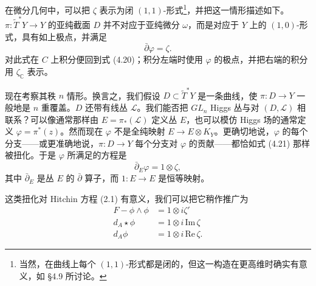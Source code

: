 \documentclass[11pt,a4paper]{article}
\begin{document}
在微分几何中，可以把 $\zeta$ 表示为闭 $(1,1)$-形式\footnote{当然，在曲线上每个 $(1,1)$-形式都是闭的，但这一构造在更高维时确实有意义，如 §4.9 所讨论。}，并把这一情形描述如下。$\pi:\widetilde{T}^*Y\to Y$ 的亚纯截面 $D$ 并不对应于亚纯微分 $\omega$，而是对应于 $Y$ 上的 $(1,0)$-形式，具有如上极点，并满足
\begin{equation}\tag{4.21}
\bar\partial\varphi=\zeta.
\end{equation}
对此式在 $C$ 上积分便回到式 (4.20)；积分左端时使用 $\varphi$ 的极点，并把右端的积分用 $\zeta_{\mathbb{C}}$ 表示。


现在考察其秩 $n$ 情形。换言之，我们假设 $D\subset\widetilde{T}^*Y$ 是一条曲线，使 $\pi:D\to Y$ 一般地是 $n$ 重覆盖。$D$ 还带有线丛 $\mathcal{L}$。我们能否把 $GL_n$ Higgs 丛与对 $(D,\mathcal{L})$ 相联系？可以像通常那样由 $E=\pi_*(\mathcal{L})$ 定义丛 $E$，也可以模仿 Higgs 场的通常定义 $\varphi=\pi^*(z)$。然而现在 $\varphi$ 不是全纯映射
$E\to E\otimes K_Y$。更确切地说，$\varphi$ 的每个分支——或更准确地说，$\pi:D\to Y$ 每个分支对 $\varphi$ 的贡献——都恰如式 (4.21) 那样被扭化。于是 $\varphi$ 所满足的方程是
\begin{equation}\tag{4.22}
\bar\partial_E\varphi=1\otimes\zeta,
\end{equation}
其中 $\bar\partial_E$ 是丛 $E$ 的 $\bar\partial$ 算子，而 $1:E\to E$ 是恒等映射。

这类扭化对 Hitchin 方程 (2.1) 有意义，我们可以把它稍作推广为
\begin{equation}\tag{4.23}
\begin{aligned}
F-\phi\wedge\phi&=1\otimes i\zeta'\\
d_A\star\phi&=1\otimes i\,\mathrm{Im}\,\zeta\\
d_A\phi&=1\otimes i\,\mathrm{Re}\,\zeta.
\end{aligned}
\end{equation}
\end{document}
